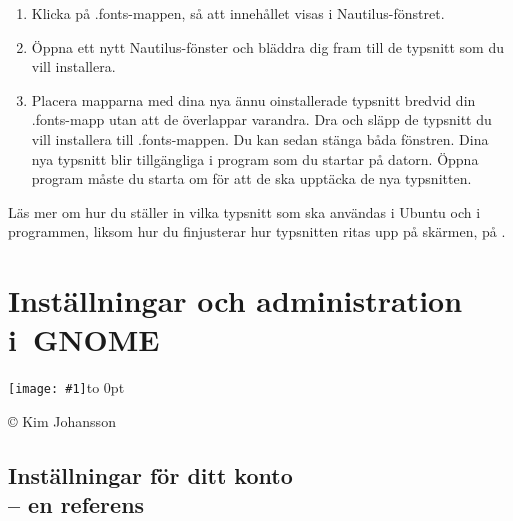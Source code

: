 \documentclass[a4paper,final]{memoir} %
\newcommand{\xrcredit}[1]{\hbox to 0pt{\hspace*{.6\baselineskip}\begin{rotate}{90}{\usefont{T1}{phv}{m}{n}\selectfont\tiny #1}\end{rotate}}}
\newcommand\xintropic[1]{{\texttt{[image: \#1]}\xrcredit{\copyright{} Kim Johansson}}\medskip}
\newcommand\xchapter[2]{\chapter{#2}\begin{center}\xintropic{#1}\end{center}}
\begin{document}
\begin{enumerate}
\item Klicka på .fonts-mappen, så att innehållet visas i Nautilus-fönstret. 

\item Öppna ett nytt Nautilus-fönster och bläddra dig fram till de typsnitt som du vill installera.

\item Placera mapparna med dina nya ännu oinstallerade typsnitt bredvid din .fonts-mapp utan att de överlappar varandra. Dra och släpp de typsnitt du vill installera till .fonts-mappen. Du kan sedan stänga båda fönstren. Dina nya typsnitt blir tillgängliga i program som du startar på datorn. Öppna program måste du starta om för att de ska upptäcka de nya typsnitten.

\end{enumerate}


\xnegskip{}

Läs mer om hur du ställer in vilka typsnitt som ska användas i Ubuntu och i programmen, liksom hur du finjusterar hur typsnitten ritas upp på skärmen, på .


\xchapter{bilder804-all/Administration_i_gnome}{Inställningar och administration \mbox{i GNOME}}


\section[Inställningar för ditt konto -- en referens]{Inställningar för ditt konto \\-- en referens}
\end{document}
